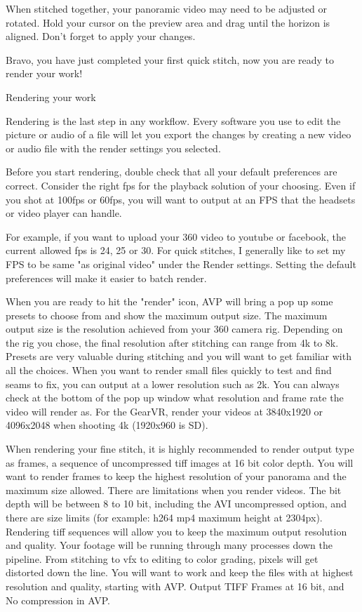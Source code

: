 \begin{fullwidth}
When stitched together, your panoramic video may need to be adjusted or rotated. Hold your cursor on the preview area and drag until the horizon is aligned. Don't forget to apply your changes.


Bravo, you have just completed your first quick stitch, now you are ready to render your work!

{\large Rendering your work \par}

Rendering is the last step in any workflow. Every software you use to edit the picture or audio of a file will let you export the changes by creating a new video or audio file with the render settings you selected.

Before you start rendering, double check that all your default preferences are correct.  Consider the right fps for the playback solution of your choosing. Even if you shot at 100fps or 60fps, you will want to output at an FPS that the headsets or video player can handle. 

For example, if you want to upload your 360 video to youtube or facebook, the current allowed fps is 24, 25 or 30. For quick stitches, I generally like to set my FPS to be same "as original video" under the Render settings. Setting the default preferences will make it easier to batch render.


When you are ready to hit the "render" icon, AVP will bring a pop up some presets to choose from and show the maximum output size. The maximum output size is the resolution achieved from your 360 camera rig. Depending on the rig you chose, the final resolution after stitching can range from 4k to 8k. Presets are very valuable during stitching and you will want to get familiar with all the choices. When you want to render small files quickly to test and find seams to fix, you can output at a lower resolution such as 2k. You can always check at the bottom of the pop up window what resolution and frame rate the video will render as. For the GearVR, render your videos at 3840x1920 or 4096x2048 when shooting 4k (1920x960 is SD).

When rendering your fine stitch, it is highly recommended to render output type as frames, a sequence of uncompressed tiff images at 16 bit color depth. You will want to render frames to keep the highest resolution of your panorama and the maximum size allowed. There are limitations when you render videos. The bit depth will be between 8 to 10 bit, including the AVI uncompressed option, and there are size limits (for example: h264 mp4 maximum height at 2304px). Rendering tiff sequences will allow you to keep the maximum output resolution and quality. Your footage will be running through many processes down the pipeline. From stitching to vfx to editing to color grading, pixels will get distorted down the line. You will want to work and keep the files with at highest resolution and quality, starting with AVP. Output TIFF Frames at 16 bit, and No compression in AVP.


\end{fullwidth}
